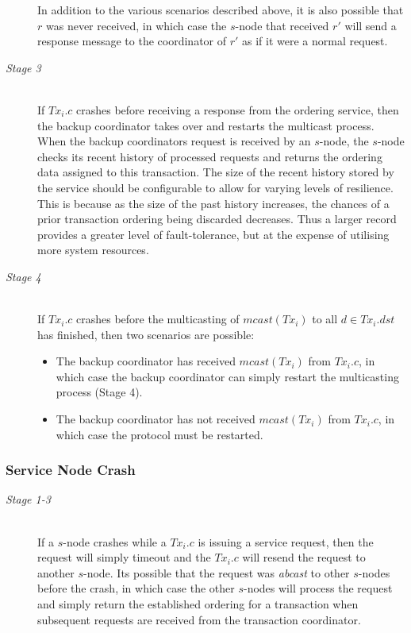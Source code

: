 \begin{description}
        In addition to the various scenarios described above, it is also possible that $r$ was never received, in which case the $s$-node that received $r'$ will send a response message to the coordinator of $r'$ as if it were a normal request.  
        
        \item[\emph{Stage 3}]  \hfill \\
        If $Tx_i.c$ crashes before receiving a response from the ordering service, then the backup coordinator takes over and restarts the multicast process.  When the backup coordinators request is received by an $s$-node, the $s$-node checks its recent history of processed requests and returns the ordering data assigned to this transaction.  The size of the recent history stored by the service should be configurable to allow for varying levels of resilience.   This is because as the size of the past history increases, the chances of a prior transaction ordering being discarded decreases.  Thus a larger record provides a greater level of fault-tolerance, but at the expense of utilising more system resources.  
        
        \item[\emph{Stage 4}]  \hfill \\
        If $Tx_i.c$ crashes before the multicasting of $mcast(Tx_i)$ to all $d \in Tx_i.dst$ has finished, then two scenarios are possible:
           \begin{itemize}
			    \item    The backup coordinator has received $mcast(Tx_i)$ from $Tx_i.c$, in which case the backup coordinator can simply restart the multicasting process (Stage 4).
			    \item    The backup coordinator has not received $mcast(Tx_i)$ from $Tx_i.c$, in which case the protocol must be restarted.  
		    \end{itemize}  
    \end{description}
    
	\subsubsection*{Service Node Crash}
	\begin{description}
       \item[\emph{Stage 1-3}] \hfill \\
       If a $s$-node crashes while a $Tx_i.c$ is issuing a service request, then the request will simply timeout and the $Tx_i.c$ will resend the request to another $s$-node.  Its possible that the request was \emph{abcast} to other $s$-nodes before the crash, in which case the other $s$-nodes will process the request and simply return the established ordering for a transaction when subsequent requests are received from the transaction coordinator.  
    \end{description}
    
